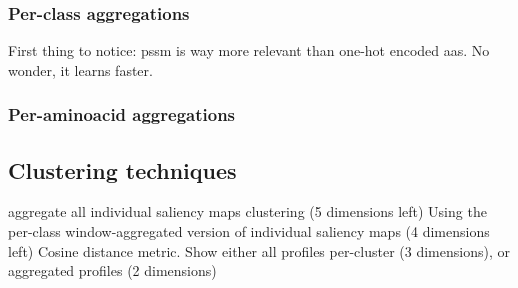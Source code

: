 		\subsubsection{Per-class aggregations}
		First thing to notice: pssm is way more relevant than one-hot encoded aas. No wonder, it learns faster.

		\subsubsection{Per-aminoacid aggregations}

	\subsection{Clustering techniques}
	aggregate all individual saliency maps %
	clustering (5 dimensions left)
	Using the per-class window-aggregated version of individual saliency maps (4 dimensions left)
	Cosine distance metric.
	Show either all profiles per-cluster (3 dimensions), or aggregated profiles (2 dimensions)
